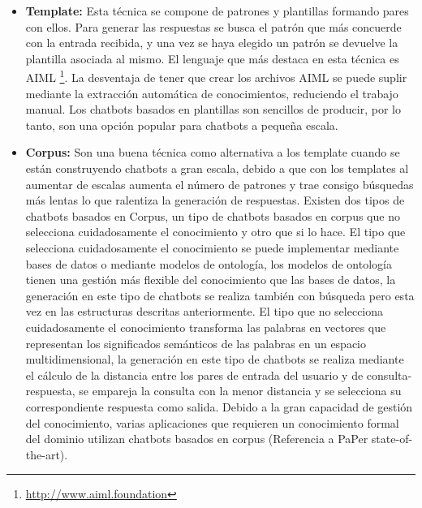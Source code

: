 \begin{itemize}
\item \textbf{Template:} Esta técnica se compone de patrones y plantillas formando pares con ellos. Para generar las respuestas se busca el patrón que más concuerde con la entrada recibida, y una vez se haya elegido un patrón se devuelve la plantilla asociada al mismo. El lenguaje que más destaca en esta técnica es AIML \footnote{\url{http://www.aiml.foundation}}. La desventaja de tener que crear los archivos AIML se puede suplir mediante la extracción automática de conocimientos, reduciendo el trabajo manual. Los chatbots basados en plantillas son sencillos de producir, por lo tanto, son una opción popular para chatbots a pequeña escala.
\item \textbf{Corpus:} Son una buena técnica como alternativa a los template cuando se están construyendo chatbots a gran escala, debido a que con los templates al aumentar de escalas aumenta el número de patrones y trae consigo búsquedas más lentas lo que ralentiza la generación de respuestas. Existen dos tipos de chatbots basados en Corpus, un tipo de chatbots basados en corpus que no selecciona cuidadosamente el conocimiento y otro que si lo hace. El tipo que selecciona cuidadosamente el conocimiento se puede implementar mediante bases de datos o mediante modelos de ontología, los modelos de ontología tienen una gestión más flexible del conocimiento que las bases de datos, la generación en este tipo de chatbots se realiza también con búsqueda pero esta vez en las estructuras descritas anteriormente. El tipo que no selecciona cuidadosamente el conocimiento transforma las palabras en vectores que representan los significados semánticos de las palabras en un espacio multidimensional, la generación en este tipo de chatbots se realiza mediante el cálculo de la distancia entre los pares de entrada del usuario y de consulta-respuesta, se empareja la consulta con la menor distancia y se selecciona su correspondiente respuesta como salida. Debido a la gran capacidad de gestión del conocimiento, varias aplicaciones que requieren un conocimiento formal del dominio utilizan chatbots basados en corpus (Referencia a PaPer state-of-the-art).

\end{itemize}
